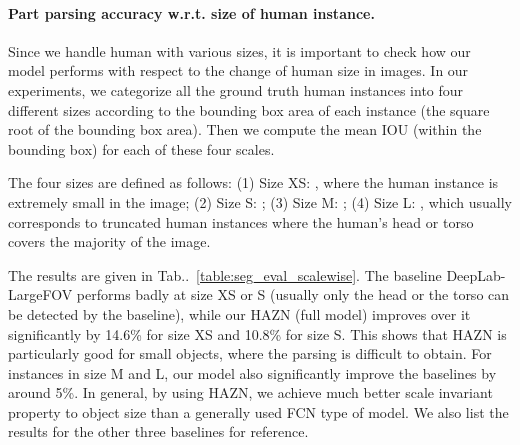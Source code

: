 \documentclass[runningheads]{llncs}
\makeatletter
\newcommand{\tabref}[1]{Tab\onedot~\ref{#1}}
\DeclareRobustCommand\onedot{\futurelet\@let@token\@onedot}
\def\@onedot{\ifx\@let@token.\else.\null\fi\xspace}
\makeatother
\begin{document}
\begin{table}[!b]
\centering
  \setlength{\tabcolsep}{10pt}
 \caption{Part parsing accuracy w.r.t. size of human instance (\%) on PASCAL-Person-Part in terms of mean IOU.}
\vspace{-1.\baselineskip}
\label{table:seg_eval_scalewise}
\end{table}  

\paragraph{Part parsing accuracy w.r.t. size of human instance.} Since we handle human with various sizes, it is important to check how our model performs with respect to the change of human size in images. 
In our experiments, we categorize all the ground truth human instances into four different sizes according to the bounding box area of each instance  (the square root of the bounding box area). Then we compute the mean IOU (within the bounding box) for each of these four scales.

The four sizes are defined as follows: (1) Size XS: , where the human instance is extremely small in the image; (2) Size S: ; (3) Size M: ; (4) Size L: , which usually corresponds to truncated human instances where the human's head or torso covers the majority of the image. 

The results are given in \tabref{table:seg_eval_scalewise}. The baseline DeepLab-LargeFOV performs badly at size XS or S (usually only the head or the torso can be detected by the baseline), while our HAZN (full model) improves over it significantly by 14.6\% for size XS and 10.8\% for size S. This shows that HAZN is particularly good for small objects, where the parsing is difficult to obtain. For instances in size M and L, our model also significantly improve the baselines by around 5\%. In general, by using HAZN, we achieve much better scale invariant property to object size than a generally used FCN type of model. We also list the results for the other three baselines for reference. 
\end{document}
